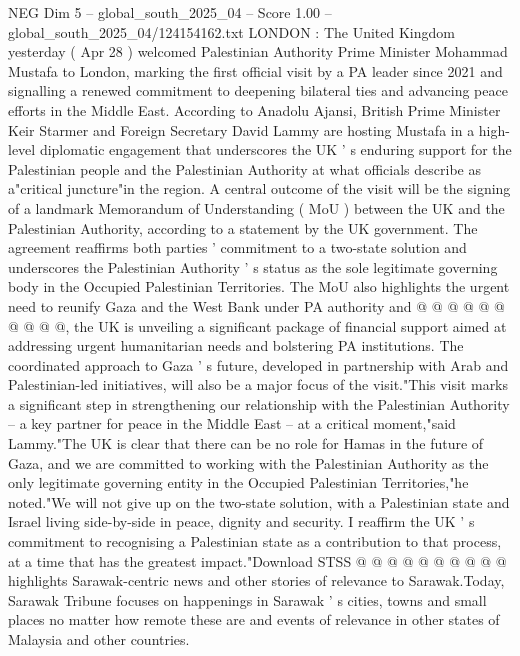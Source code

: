 \begin{textsample}{NEG Dim 5 – global\_south\_2025\_04 – Score 1.00 – global\_south\_2025\_04/124154162.txt}  \label{ex:f5_neg_397}
LONDON : The United Kingdom yesterday ( Apr 28 ) welcomed Palestinian Authority Prime Minister Mohammad Mustafa to London, marking the first official visit by a PA leader since 2021 and signalling a renewed commitment to deepening bilateral ties and advancing peace efforts in the Middle East.
According to Anadolu Ajansi, British Prime Minister Keir Starmer and Foreign Secretary David Lammy are hosting Mustafa in a high-level diplomatic engagement that underscores the UK ' s enduring support for the Palestinian people and the Palestinian Authority at what officials describe as a"critical juncture"in the region.
A central outcome of the visit will be the signing of a landmark Memorandum of Understanding ( MoU ) between the UK and the Palestinian Authority, according to a statement by the UK government.
The agreement reaffirms both parties ' commitment to a two-state solution and underscores the Palestinian Authority ' s status as the sole legitimate governing body in the Occupied Palestinian Territories.
The MoU also highlights the urgent need to reunify Gaza and the West Bank under PA authority and @ @ @ @ @ @ @ @ @ @, the UK is unveiling a significant package of financial support aimed at addressing urgent humanitarian needs and bolstering PA institutions.
The coordinated approach to Gaza ' s future, developed in partnership with Arab and Palestinian-led initiatives, will also be a major focus of the visit."This visit marks a significant step in strengthening our relationship with the Palestinian Authority -- a key partner for peace in the Middle East -- at a critical moment,"said Lammy."The UK is clear that there can be no role for Hamas in the future of Gaza, and we are committed to working with the Palestinian Authority as the only legitimate governing entity in the Occupied Palestinian Territories,"he noted."We will not give up on the two-state solution, with a Palestinian state and Israel living side-by-side in peace, dignity and security.
I reaffirm the UK ' s commitment to recognising a Palestinian state as a contribution to that process, at a time that has the greatest impact."Download STSS @ @ @ @ @ @ @ @ @ @ highlights Sarawak-centric news and other stories of relevance to Sarawak.Today, Sarawak Tribune focuses on happenings in Sarawak ' s cities, towns and small places no matter how remote these are and events of relevance in other states of Malaysia and other countries.

\end{textsample}
